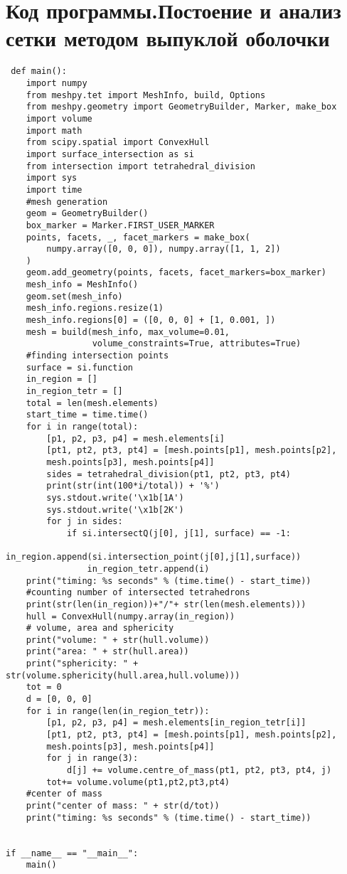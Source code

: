 \section*{\centering Код программы.Постоение и анализ сетки методом выпуклой оболочки}
\begin{footnotesize}
\begin{lstlisting}
 def main():
    import numpy
    from meshpy.tet import MeshInfo, build, Options
    from meshpy.geometry import GeometryBuilder, Marker, make_box
    import volume
    import math
    from scipy.spatial import ConvexHull
    import surface_intersection as si
    from intersection import tetrahedral_division
    import sys
    import time
    #mesh generation
    geom = GeometryBuilder()
    box_marker = Marker.FIRST_USER_MARKER
    points, facets, _, facet_markers = make_box(
        numpy.array([0, 0, 0]), numpy.array([1, 1, 2])
    )
    geom.add_geometry(points, facets, facet_markers=box_marker)
    mesh_info = MeshInfo()
    geom.set(mesh_info)
    mesh_info.regions.resize(1)
    mesh_info.regions[0] = ([0, 0, 0] + [1, 0.001, ])
    mesh = build(mesh_info, max_volume=0.01,
                 volume_constraints=True, attributes=True)
    #finding intersection points
    surface = si.function
    in_region = []
    in_region_tetr = []
    total = len(mesh.elements)
    start_time = time.time()
    for i in range(total):
        [p1, p2, p3, p4] = mesh.elements[i]
        [pt1, pt2, pt3, pt4] = [mesh.points[p1], mesh.points[p2],
        mesh.points[p3], mesh.points[p4]]
        sides = tetrahedral_division(pt1, pt2, pt3, pt4)
        print(str(int(100*i/total)) + '%')
        sys.stdout.write('\x1b[1A')
        sys.stdout.write('\x1b[2K')
        for j in sides:
            if si.intersectQ(j[0], j[1], surface) == -1:
                in_region.append(si.intersection_point(j[0],j[1],surface))
                in_region_tetr.append(i)
    print("timing: %s seconds" % (time.time() - start_time))
    #counting number of intersected tetrahedrons
    print(str(len(in_region))+"/"+ str(len(mesh.elements)))
    hull = ConvexHull(numpy.array(in_region))
    # volume, area and sphericity
    print("volume: " + str(hull.volume))
    print("area: " + str(hull.area))
    print("sphericity: " + str(volume.sphericity(hull.area,hull.volume)))
    tot = 0
    d = [0, 0, 0]
    for i in range(len(in_region_tetr)):
        [p1, p2, p3, p4] = mesh.elements[in_region_tetr[i]]
        [pt1, pt2, pt3, pt4] = [mesh.points[p1], mesh.points[p2],
        mesh.points[p3], mesh.points[p4]]
        for j in range(3):
            d[j] += volume.centre_of_mass(pt1, pt2, pt3, pt4, j)
        tot+= volume.volume(pt1,pt2,pt3,pt4)
    #center of mass
    print("center of mass: " + str(d/tot))
    print("timing: %s seconds" % (time.time() - start_time))


if __name__ == "__main__":
    main()

\end{lstlisting}
\end{footnotesize}
